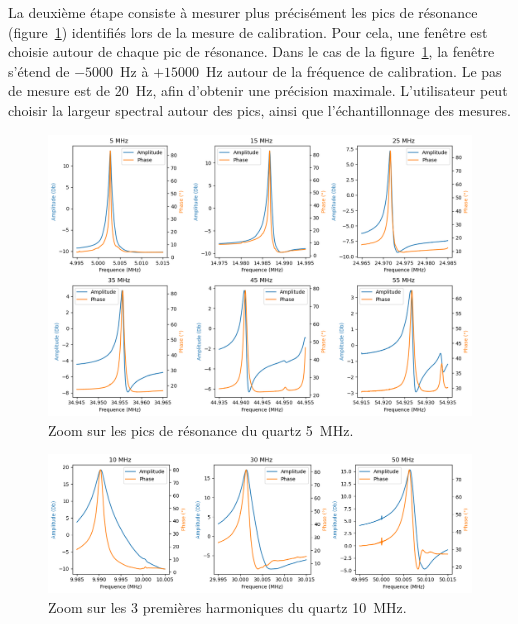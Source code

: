 La deuxième étape consiste à mesurer plus précisément les pics de résonance (figure~\ref{fig:harmonic 5MHz plot}) identifiés lors de la mesure de calibration.  
Pour cela, une fenêtre est choisie autour de chaque pic de résonance.  
Dans le cas de la figure~\ref{fig:harmonic 5MHz plot}, la fenêtre s’étend de \(-5000\)~Hz à \(+15000\)~Hz autour de la fréquence de calibration. Le pas de mesure est de 20~Hz, afin d’obtenir une précision maximale. 
L'utilisateur peut choisir la largeur spectral autour des pics, ainsi que l'échantillonnage des mesures.

\begin{figure}[H]
    \centering
    \includegraphics[width=\textwidth]{assets/figures/5MhzPeak.png}
    \caption{Zoom sur les pics de résonance du quartz 5~MHz.}
    \label{fig:harmonic 5MHz plot}
\end{figure}

\begin{figure}[H]
    \centering
    \includegraphics[width=\textwidth]{assets/figures/10MhzPeak.png}
    \caption{Zoom sur les 3 premières harmoniques du quartz 10~MHz.}
    \label{fig:harmonic 10MHz plot}
\end{figure}

\newpage

